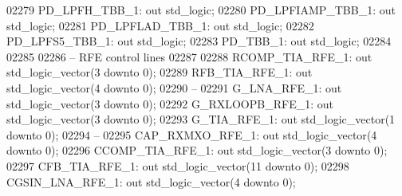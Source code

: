 \begin{DoxyCode}
02279     PD\_LPFH\_TBB\_1:  \textcolor{keywordflow}{out} \textcolor{comment}{std\_logic};
02280     PD\_LPFIAMP\_TBB\_1:   \textcolor{keywordflow}{out} \textcolor{comment}{std\_logic};
02281     PD\_LPFLAD\_TBB\_1:    \textcolor{keywordflow}{out} \textcolor{comment}{std\_logic};
02282     PD\_LPFS5\_TBB\_1: \textcolor{keywordflow}{out} \textcolor{comment}{std\_logic};
02283     PD\_TBB\_1:   \textcolor{keywordflow}{out} \textcolor{comment}{std\_logic};
02284 
02285 
02286 \textcolor{keyword}{    -- RFE control lines}
02287 
02288     RCOMP\_TIA\_RFE\_1:    \textcolor{keywordflow}{out} \textcolor{comment}{std\_logic\_vector}(\textcolor{vhdllogic}{}\textcolor{vhdllogic}{3} \textcolor{keywordflow}{downto} \textcolor{vhdllogic}{}\textcolor{vhdllogic}{0});
02289     RFB\_TIA\_RFE\_1:  \textcolor{keywordflow}{out} \textcolor{comment}{std\_logic\_vector}(\textcolor{vhdllogic}{}\textcolor{vhdllogic}{4} \textcolor{keywordflow}{downto} \textcolor{vhdllogic}{}\textcolor{vhdllogic}{0});
02290 \textcolor{keyword}{    --}
02291     G\_LNA\_RFE\_1:    \textcolor{keywordflow}{out} \textcolor{comment}{std\_logic\_vector}(\textcolor{vhdllogic}{}\textcolor{vhdllogic}{3} \textcolor{keywordflow}{downto} \textcolor{vhdllogic}{}\textcolor{vhdllogic}{0});
02292     G\_RXLOOPB\_RFE\_1:    \textcolor{keywordflow}{out} \textcolor{comment}{std\_logic\_vector}(\textcolor{vhdllogic}{}\textcolor{vhdllogic}{3} \textcolor{keywordflow}{downto} \textcolor{vhdllogic}{}\textcolor{vhdllogic}{0});
02293     G\_TIA\_RFE\_1:    \textcolor{keywordflow}{out} \textcolor{comment}{std\_logic\_vector}(\textcolor{vhdllogic}{}\textcolor{vhdllogic}{1} \textcolor{keywordflow}{downto} \textcolor{vhdllogic}{}\textcolor{vhdllogic}{0});
02294 \textcolor{keyword}{    --}
02295     CAP\_RXMXO\_RFE\_1:    \textcolor{keywordflow}{out} \textcolor{comment}{std\_logic\_vector}(\textcolor{vhdllogic}{}\textcolor{vhdllogic}{4} \textcolor{keywordflow}{downto} \textcolor{vhdllogic}{}\textcolor{vhdllogic}{0});
02296     CCOMP\_TIA\_RFE\_1:    \textcolor{keywordflow}{out} \textcolor{comment}{std\_logic\_vector}(\textcolor{vhdllogic}{}\textcolor{vhdllogic}{3} \textcolor{keywordflow}{downto} \textcolor{vhdllogic}{}\textcolor{vhdllogic}{0});
02297     CFB\_TIA\_RFE\_1:  \textcolor{keywordflow}{out} \textcolor{comment}{std\_logic\_vector}(\textcolor{vhdllogic}{}\textcolor{vhdllogic}{11} \textcolor{keywordflow}{downto} \textcolor{vhdllogic}{}\textcolor{vhdllogic}{0});
02298     CGSIN\_LNA\_RFE\_1:    \textcolor{keywordflow}{out} \textcolor{comment}{std\_logic\_vector}(\textcolor{vhdllogic}{}\textcolor{vhdllogic}{4} \textcolor{keywordflow}{downto} \textcolor{vhdllogic}{}\textcolor{vhdllogic}{0});

\end{DoxyCode}
